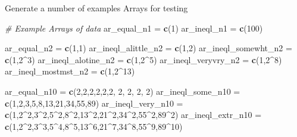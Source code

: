 \documentclass[
]{book}
\newenvironment{Shaded}{\begin{snugshade}}{\end{snugshade}}
\newcommand{\CommentTok}[1]{\textcolor[rgb]{0.56,0.35,0.01}{\textit{#1}}}
\newcommand{\DecValTok}[1]{\textcolor[rgb]{0.00,0.00,0.81}{#1}}
\newcommand{\KeywordTok}[1]{\textcolor[rgb]{0.13,0.29,0.53}{\textbf{#1}}}
\newcommand{\NormalTok}[1]{#1}
\newcommand{\OperatorTok}[1]{\textcolor[rgb]{0.81,0.36,0.00}{\textbf{#1}}}
\newcommand{\StringTok}[1]{\textcolor[rgb]{0.31,0.60,0.02}{#1}}
\begin{document}
Generate a number of examples Arrays for testing

\begin{Shaded}
\begin{Highlighting}[]
\CommentTok{# Example Arrays of data}
\NormalTok{ar_equal_n1 =}\StringTok{ }\KeywordTok{c}\NormalTok{(}\DecValTok{1}\NormalTok{)}
\NormalTok{ar_ineql_n1 =}\StringTok{ }\KeywordTok{c}\NormalTok{(}\DecValTok{100}\NormalTok{)}

\NormalTok{ar_equal_n2 =}\StringTok{ }\KeywordTok{c}\NormalTok{(}\DecValTok{1}\NormalTok{,}\DecValTok{1}\NormalTok{)}
\NormalTok{ar_ineql_alittle_n2 =}\StringTok{ }\KeywordTok{c}\NormalTok{(}\DecValTok{1}\NormalTok{,}\DecValTok{2}\NormalTok{)}
\NormalTok{ar_ineql_somewht_n2 =}\StringTok{ }\KeywordTok{c}\NormalTok{(}\DecValTok{1}\NormalTok{,}\DecValTok{2}\OperatorTok{^}\DecValTok{3}\NormalTok{)}
\NormalTok{ar_ineql_alotine_n2 =}\StringTok{ }\KeywordTok{c}\NormalTok{(}\DecValTok{1}\NormalTok{,}\DecValTok{2}\OperatorTok{^}\DecValTok{5}\NormalTok{)}
\NormalTok{ar_ineql_veryvry_n2 =}\StringTok{ }\KeywordTok{c}\NormalTok{(}\DecValTok{1}\NormalTok{,}\DecValTok{2}\OperatorTok{^}\DecValTok{8}\NormalTok{)}
\NormalTok{ar_ineql_mostmst_n2 =}\StringTok{ }\KeywordTok{c}\NormalTok{(}\DecValTok{1}\NormalTok{,}\DecValTok{2}\OperatorTok{^}\DecValTok{13}\NormalTok{)}

\NormalTok{ar_equal_n10 =}\StringTok{ }\KeywordTok{c}\NormalTok{(}\DecValTok{2}\NormalTok{,}\DecValTok{2}\NormalTok{,}\DecValTok{2}\NormalTok{,}\DecValTok{2}\NormalTok{,}\DecValTok{2}\NormalTok{,}\DecValTok{2}\NormalTok{, }\DecValTok{2}\NormalTok{, }\DecValTok{2}\NormalTok{, }\DecValTok{2}\NormalTok{, }\DecValTok{2}\NormalTok{)}
\NormalTok{ar_ineql_some_n10 =}\StringTok{ }\KeywordTok{c}\NormalTok{(}\DecValTok{1}\NormalTok{,}\DecValTok{2}\NormalTok{,}\DecValTok{3}\NormalTok{,}\DecValTok{5}\NormalTok{,}\DecValTok{8}\NormalTok{,}\DecValTok{13}\NormalTok{,}\DecValTok{21}\NormalTok{,}\DecValTok{34}\NormalTok{,}\DecValTok{55}\NormalTok{,}\DecValTok{89}\NormalTok{)}
\NormalTok{ar_ineql_very_n10 =}\StringTok{ }\KeywordTok{c}\NormalTok{(}\DecValTok{1}\NormalTok{,}\DecValTok{2}\OperatorTok{^}\DecValTok{2}\NormalTok{,}\DecValTok{3}\OperatorTok{^}\DecValTok{2}\NormalTok{,}\DecValTok{5}\OperatorTok{^}\DecValTok{2}\NormalTok{,}\DecValTok{8}\OperatorTok{^}\DecValTok{2}\NormalTok{,}\DecValTok{13}\OperatorTok{^}\DecValTok{2}\NormalTok{,}\DecValTok{21}\OperatorTok{^}\DecValTok{2}\NormalTok{,}\DecValTok{34}\OperatorTok{^}\DecValTok{2}\NormalTok{,}\DecValTok{55}\OperatorTok{^}\DecValTok{2}\NormalTok{,}\DecValTok{89}\OperatorTok{^}\DecValTok{2}\NormalTok{)}
\NormalTok{ar_ineql_extr_n10 =}\StringTok{ }\KeywordTok{c}\NormalTok{(}\DecValTok{1}\NormalTok{,}\DecValTok{2}\OperatorTok{^}\DecValTok{2}\NormalTok{,}\DecValTok{3}\OperatorTok{^}\DecValTok{3}\NormalTok{,}\DecValTok{5}\OperatorTok{^}\DecValTok{4}\NormalTok{,}\DecValTok{8}\OperatorTok{^}\DecValTok{5}\NormalTok{,}\DecValTok{13}\OperatorTok{^}\DecValTok{6}\NormalTok{,}\DecValTok{21}\OperatorTok{^}\DecValTok{7}\NormalTok{,}\DecValTok{34}\OperatorTok{^}\DecValTok{8}\NormalTok{,}\DecValTok{55}\OperatorTok{^}\DecValTok{9}\NormalTok{,}\DecValTok{89}\OperatorTok{^}\DecValTok{10}\NormalTok{)}
\end{Highlighting}
\end{Shaded}
\end{document}
